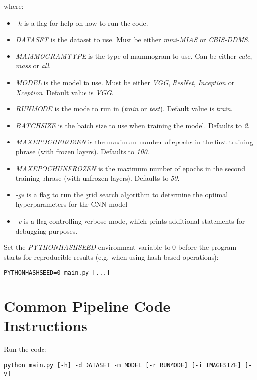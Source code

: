 where:
\begin{itemize}
    \item \textit{-h} is a  flag for help on how to run the code.
    \item \textit{DATASET} is the dataset to use. Must be either \textit{mini-MIAS} or \textit{CBIS-DDMS}.
    \item \textit{MAMMOGRAMTYPE} is the type of mammogram to use. Can be either \textit{calc}, \textit{mass} or \textit{all}.
    \item \textit{MODEL} is the model to use. Must be either \textit{VGG}, \textit{ResNet}, \textit{Inception} or \textit{Xception}. Default value is \textit{VGG}.
    \item \textit{RUNMODE} is the mode to run in (\textit{train} or \textit{test}). Default value is \textit{train}.
    \item \textit{BATCHSIZE} is the batch size to use when training the model. Defaults to \textit{2}.
    \item \textit{MAXEPOCHFROZEN} is the maximum number of epochs in the first training phrase (with frozen layers). Defaults to \textit{100}.
    \item \textit{MAXEPOCHUNFROZEN} is the maximum number of epochs in the second training phrase (with unfrozen layers). Defaults to \textit{50}.
    \item \textit{-gs} is a flag to run the grid search algorithm to determine the optimal hyperparameters for the CNN model.
    \item \textit{-v} is a flag controlling verbose mode, which prints additional statements for debugging purposes.
\end{itemize}

Set the \textit{PYTHONHASHSEED} environment variable to 0 before the program starts for reproducible results (e.g. when using hash-based operations):

\begin{lstlisting}
PYTHONHASHSEED=0 main.py [...]
\end{lstlisting}


\section{Common Pipeline Code Instructions}

Run the code:

\begin{lstlisting}
python main.py [-h] -d DATASET -m MODEL [-r RUNMODE] [-i IMAGESIZE] [-v]
\end{lstlisting}

